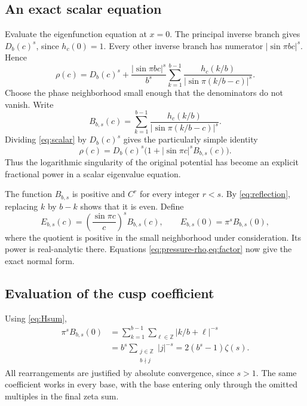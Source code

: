 \documentclass[11pt,a4paper]{article}
\numberwithin{equation}{section}
\theoremstyle{definition}
\theoremstyle{remark}
\newcommand{\ZZ}{\mathbb Z}
\begin{document}
\subsection{An exact scalar equation}
Evaluate the eigenfunction equation at $x=0$. The principal inverse
branch gives $D_b(c)^s$, since $h_c(0)=1$. Every other inverse branch
has numerator $|\sin\pi bc|^s$. Hence
\begin{equation}
 \rho(c)=D_b(c)^s+
 \frac{|\sin\pi bc|^s}{b^s}
 \sum_{k=1}^{b-1}
 \frac{h_c(k/b)}{|\sin\pi(k/b-c)|^s}.
 \label{eq:scalar}
\end{equation}
Choose the phase neighborhood small enough that the denominators do not
vanish. Write
\begin{equation}
 B_{b,s}(c)=\sum_{k=1}^{b-1}
 \frac{h_c(k/b)}{|\sin\pi(k/b-c)|^s}.
 \label{eq:B}
\end{equation}
Dividing \cref{eq:scalar} by $D_b(c)^s$ gives the particularly simple
identity
\begin{equation}
 \rho(c)=D_b(c)^s\bigl(1+|\sin\pi c|^sB_{b,s}(c)\bigr).
 \label{eq:factor}
\end{equation}
Thus the logarithmic singularity of the original potential has become
an explicit fractional power in a scalar eigenvalue equation.

The function $B_{b,s}$ is positive and $C^r$ for every integer $r<s$.
By \cref{eq:reflection}, replacing $k$ by $b-k$ shows that it is even.
Define
\begin{equation}
 E_{b,s}(c)=\left(\frac{\sin\pi c}{c}\right)^sB_{b,s}(c),
 \qquad E_{b,s}(0)=\pi^sB_{b,s}(0),
 \label{eq:E}
\end{equation}
where the quotient is positive in the small neighborhood under
consideration. Its power is real-analytic there. Equations
\cref{eq:pressure-rho,eq:factor} now give the exact normal form.

\subsection{Evaluation of the cusp coefficient}
Using \cref{eq:Hsum},
\begin{align}
 \pi^sB_{b,s}(0)
 &=\sum_{k=1}^{b-1}\sum_{\ell\in\ZZ}|k/b+\ell|^{-s}\\
 &=b^s\sum_{\substack{j\in\ZZ\\b\nmid j}}|j|^{-s}
 =2(b^s-1)\zeta(s).
 \label{eq:amplitude}
\end{align}
All rearrangements are justified by absolute convergence, since $s>1$.
The same coefficient works in every base, with the base entering only
through the omitted multiples in the final zeta sum.
\end{document}
